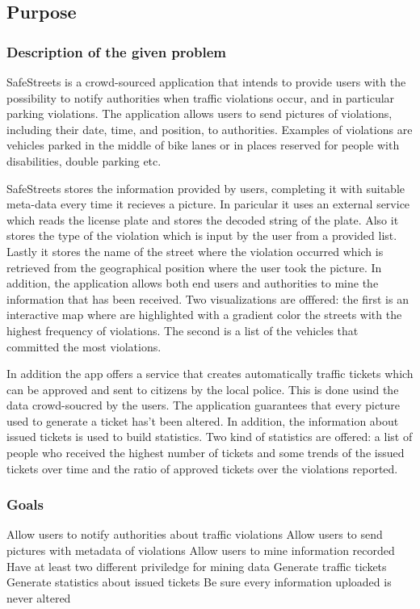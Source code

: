 \subsection{Purpose}

\subsubsection{Description of the given problem}
SafeStreets is a crowd-sourced application that intends to provide users with the possibility to notify authorities when traffic violations occur, and in particular parking violations. The application allows users to send pictures of violations, including their date, time, and position, to authorities. Examples of violations are vehicles parked in the middle of bike lanes or in places reserved for people with disabilities, double parking etc.

SafeStreets stores the information provided by users, completing it with suitable meta-data every time it recieves a picture.
In paricular it uses an external service which reads the license plate and stores the decoded string of the plate.
Also it stores the type of the violation which is input by the user from a provided list.
Lastly it stores the name of the street where the violation occurred which is retrieved from the geographical position where the user took the picture.
In addition, the application allows both end users and authorities to mine the information that has been received.
Two visualizations are offfered: the first is an interactive map where are highlighted with a gradient color the streets  with the highest frequency of violations.
The second is a list of the vehicles that committed the most violations.

In addition the app offers a service that creates automatically traffic tickets which can be approved and sent to citizens by the local police.  This is done usind the data crowd-soucred by the users.
The application guarantees that every picture used to generate a ticket has't been altered.
In addition, the information about issued tickets is used to build statistics.
Two kind of statistics are offered: a list of people who received the highest number of tickets and some trends of the issued tickets over time and the ratio of approved tickets over the violations reported.


\subsubsection{Goals}
\begin{enumerate}
   Allow users to notify authorities about traffic violations
   Allow users to send pictures with metadata of violations
   Allow users to mine information recorded
   Have at least two different  priviledge for mining data
   Generate traffic tickets
   Generate statistics about issued tickets
   Be sure every information uploaded is never altered
\end{enumerate}


